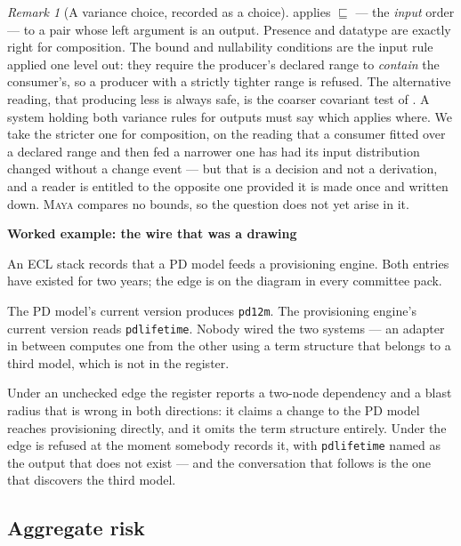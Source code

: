 \documentclass[11pt,a4paper]{article}
\renewcommand{\_}{\oldunderscore\allowbreak}
\theoremstyle{plain}
\theoremstyle{definition}
\theoremstyle{definition}
\theoremstyle{remark}
\newtheorem{remark}[theorem]{Remark}
\newcommand{\wk}[1]{\textbf{Worked example: #1}\par\smallskip}
\begin{document}
\begin{remark}[A variance choice, recorded as a choice]\label{rem:variance}
 applies $\sqsubseteq$ --- the \emph{input} order --- to a pair whose left argument is
an output. Presence and datatype are exactly right for composition. The bound and nullability conditions
are the input rule applied one level out: they require the producer's declared range to \emph{contain}
the consumer's, so a producer with a strictly tighter range is refused. The alternative reading, that
producing less is always safe, is the coarser covariant test of . A system holding
both variance rules for outputs must say which applies where. We take the stricter one for composition,
on the reading that a consumer fitted over a declared range and then fed a narrower one has had its input
distribution changed without a change event --- but that is a decision and not a derivation, and a reader
is entitled to the opposite one provided it is made once and written down. \textsc{Maya} compares no
bounds, so the question does not yet arise in it.
\end{remark}

\begin{worked}
\wk{the wire that was a drawing}
An ECL stack records that a PD model feeds a provisioning engine. Both entries have existed for two
years; the edge is on the diagram in every committee pack.

The PD model's current version produces \texttt{pd\_12m}. The provisioning engine's current version reads
\texttt{pd\_lifetime}. Nobody wired the two systems --- an adapter in between computes one from the other
using a term structure that belongs to a third model, which is not in the register.

Under an unchecked edge the register reports a two-node dependency and a blast radius that is wrong in
both directions: it claims a change to the PD model reaches provisioning directly, and it omits the term
structure entirely. Under  the edge is refused at the moment somebody records it, with
\texttt{pd\_lifetime} named as the output that does not exist --- and the conversation that follows is the
one that discovers the third model.
\end{worked}

\subsection{Aggregate risk}
\end{document}
